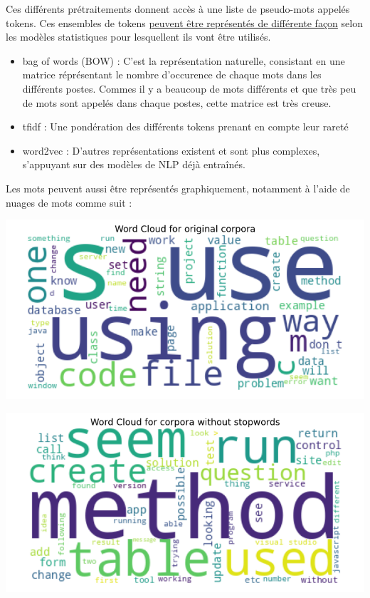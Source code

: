 \documentclass[a4paper,11pt]{article}
\begin{document}
Ces différents prétraitements donnent accès à une liste de pseudo-mots appelés tokens. Ces ensembles de tokens {\color{blue} \href{https://openclassrooms.com/fr/courses/4470541-analysez-vos-donnees-textuelles/4855001-representez-votre-corpus-en-bag-of-words}{peuvent être représentés de différente façon}} selon les modèles statistiques pour lesquellent ils vont être utilisés.
\begin{itemize}
    \item bag of words (BOW) : C'est la représentation naturelle, consistant en une matrice réprésentant le nombre d'occurence de chaque mots dans les différents postes. Commes il y a beaucoup de mots différents et que très peu de mots sont appelés dans chaque postes, cette matrice est très creuse.
    \item tfidf : Une pondération des différents tokens prenant en compte leur rareté
    \item word2vec : D'autres représentations existent et sont plus complexes, s'appuyant sur des modèles de NLP déjà entraînés.
\end{itemize}

Les mots peuvent aussi être représentés graphiquement, notamment à l'aide de nuages de mots comme suit :

\begin{minipage}{0.48\linewidth}
    \begin{center}
       \includegraphics[width=\linewidth]{figures/word_cloud_corpora.png}
    \end{center}
\end{minipage}
\begin{minipage}{0.48\linewidth}
    \begin{center}
       \includegraphics[width=\linewidth]{figures/word_cloud_corpora2.png}
    \end{center}
\end{minipage}
\end{document}
